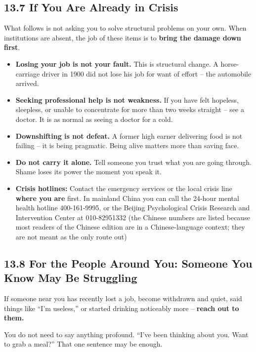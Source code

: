 \documentclass[11pt,a4paper]{article}
\begin{document}
\subsection{13.7 If You Are Already in Crisis}

What follows is not asking you to solve structural problems on your own. When institutions are absent, the job of these items is to \textbf{bring the damage down first}.

\begin{itemize}
  \item \textbf{Losing your job is not your fault.} This is structural change. A horse-carriage driver in 1900 did not lose his job for want of effort -- the automobile arrived.
  \item \textbf{Seeking professional help is not weakness.} If you have felt hopeless, sleepless, or unable to concentrate for more than two weeks straight -- see a doctor. It is as normal as seeing a doctor for a cold.
  \item \textbf{Downshifting is not defeat.} A former high earner delivering food is not failing -- it is being pragmatic. Being alive matters more than saving face.
  \item \textbf{Do not carry it alone.} Tell someone you trust what you are going through. Shame loses its power the moment you speak it.
  \item \textbf{Crisis hotlines:} Contact the emergency services or the local crisis line \textbf{where you are} first. In mainland China you can call the 24-hour mental health hotline 400-161-9995, or the Beijing Psychological Crisis Research and Intervention Center at 010-82951332 (the Chinese numbers are listed because most readers of the Chinese edition are in a Chinese-language context; they are not meant as the only route out)
\end{itemize}

\subsection{13.8 For the People Around You: Someone You Know May Be Struggling}

If someone near you has recently lost a job, become withdrawn and quiet, said things like ``I'm useless,'' or started drinking noticeably more -- \textbf{reach out to them.}

You do not need to say anything profound. ``I've been thinking about you. Want to grab a meal?'' That one sentence may be enough.
\end{document}
